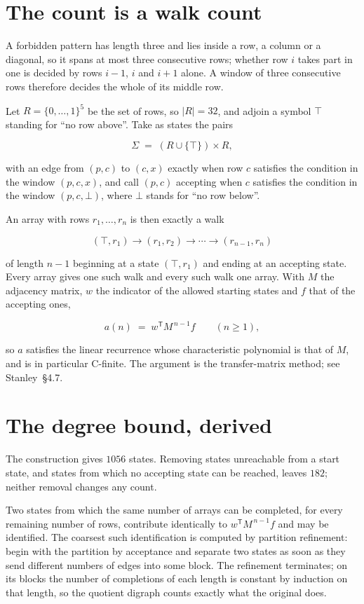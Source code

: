 \documentclass[11pt]{article}
\theoremstyle{definition}
\begin{document}
\section{The count is a walk count}

A forbidden pattern has length three and lies inside a row, a column or a diagonal, so it spans at most three consecutive rows; whether row $i$ takes part in one is decided by rows $i-1$, $i$ and $i+1$ alone. A window of three consecutive rows therefore decides the whole of its middle row.

Let $R = \{0,\dots,1\}^{5}$ be the set of rows, so $|R| = 32$, and adjoin a symbol $\top$ standing for ``no row above''. Take as states the pairs

\[\Sigma \;=\; (R \cup \{\top\}) \times R,\]

with an edge from $(p,c)$ to $(c,x)$ exactly when row $c$ satisfies the condition in the window $(p,c,x)$, and call $(p,c)$ accepting when $c$ satisfies the condition in the window $(p,c,\bot)$, where $\bot$ stands for ``no row below''.

An array with rows $r_1,\dots,r_n$ is then exactly a walk

\[(\top,r_1) \to (r_1,r_2) \to \cdots \to (r_{n-1},r_n)\]

of length $n-1$ beginning at a state $(\top,r_1)$ and ending at an accepting state. Every array gives one such walk and every such walk one array. With $M$ the adjacency matrix, $w$ the indicator of the allowed starting states and $f$ that of the accepting ones,

\[a(n) \;=\; w^{\mathsf T} M^{\,n-1} f \qquad (n \ge 1),\]

so $a$ satisfies the linear recurrence whose characteristic polynomial is that of $M$, and is in particular C-finite. The argument is the transfer-matrix method; see Stanley~\S4.7.

\section{The degree bound, derived}

The construction gives $1056$ states. Removing states unreachable from a start state, and states from which no accepting state can be reached, leaves $182$; neither removal changes any count.

Two states from which the same number of arrays can be completed, for every remaining number of rows, contribute identically to $w^{\mathsf T}M^{\,n-1}f$ and may be identified. The coarsest such identification is computed by partition refinement: begin with the partition by acceptance and separate two states as soon as they send different numbers of edges into some block. The refinement terminates; on its blocks the number of completions of each length is constant by induction on that length, so the quotient digraph counts exactly what the original does.
\end{document}
